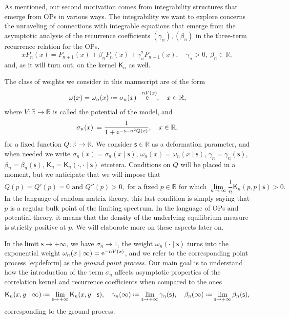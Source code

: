 \documentclass[reqno,a4paper,11pt]{amsart}
\DeclareMathOperator{\ee}{\rm e}
\newcommand{\R}{\mathbb{R}}
\newcommand*{\deff}{\mathrel{\vcenter{\baselineskip0.5ex \lineskiplimit0pt
                     \hbox{\scriptsize.}\hbox{\scriptsize.}}}%
                     =}
\newcommand{\msf}{\mathsf}
\newcommand{\sad}{\msf s}
\theoremstyle{definition}
\theoremstyle{remark}
\numberwithin{equation}{section}
\begin{document}
As mentioned, our second motivation comes from integrability structures that emerge from OPs in various ways. The integrability we want to explore concerns the unraveling of connections with integrable equations that emerge from the asymptotic analysis of the recurrence coefficients $(\gamma_n), (\beta_n)$ in the three-term recurrence relation for the OPs,
%
\begin{equation}\label{eq:TTRR}
xP_n(x)=P_{n+1}(x)+\beta_nP_n(x)+\gamma_n^2P_{n-1}(x),\quad \gamma_n>0, \; \beta_n\in \R,
\end{equation}
%
and, as it will turn out, on the kernel $\msf K_n$ as well.

The class of weights we consider in this manuscript are of the form
%
\begin{equation}\label{eq:deffweight}
\omega(x)=\omega_n(x)\deff \sigma_n(x) \ee^{-nV(x)},  \quad x\in \R,
\end{equation}
where $V:\R\to \R$ is called the potential of the model, and
\begin{equation}\label{def:sigman}
\sigma_n(x)\deff \frac{1}{1+\ee^{-\sad-n^{2}Q(x)}},\quad x \in \R,
\end{equation}
%
for a fixed function $Q:\R\to \R$. We consider $\sad \in \R$ as a deformation parameter, and when needed we write $\sigma_n(x)=\sigma_n(x\mid \sad)$, $\omega_n(x)=\omega_n(x\mid \sad)$, $\gamma_n=\gamma_n(\sad)$, $\beta_n=\beta_n(\sad)$, $\msf K_n=\msf K_n(\cdot,\cdot\mid \sad)$ etcetera. Conditions on $Q$ will be placed in a moment, but we anticipate that we will impose that 
%
\begin{equation}\label{eq:conditionsQintro}
Q(p)=Q'(p)=0 \text{ and }Q''(p)>0, \text{ for a fixed } p\in \R \text{ for which }
%
\lim_{n\to\infty} \frac{1}{n}\msf K_n(p,p\mid \sad)>0.
\end{equation}
%
In the language of random matrix theory, this last condition is simply saying that $p$ is a regular bulk point of the limiting spectrum. In the language of OPs and potential theory, it means that the density of the underlying equilibrium measure is strictly positive at $p$. We will elaborate more on these aspects later on.

In the limit $\sad\to +\infty$, we have $\sigma_n\to 1$, the weight $\omega_n(\cdot\mid \sad)$ turns into the exponential weight $\omega_n(x\mid \infty)=\ee^{-nV(x)}$, and we refer to the corresponding point process \eqref{eq:deform} as the {\it ground point process}. Our main goal is to understand how the introduction of the term $\sigma_n$ affects asymptotic properties of the correlation kernel and recurrence coefficients when compared to the ones 
%
$$
\msf K_n(x,y\mid \infty)\deff \lim_{\sad\to +\infty}\msf K_n(x,y\mid \sad),\quad \gamma_n(\infty)\deff \lim_{\sad\to +\infty}\gamma_n(\sad),\quad 
\beta_n(\infty)\deff \lim_{\sad\to +\infty}\beta_n(\sad),
$$ 
%
corresponding to the ground process. 
\end{document}
